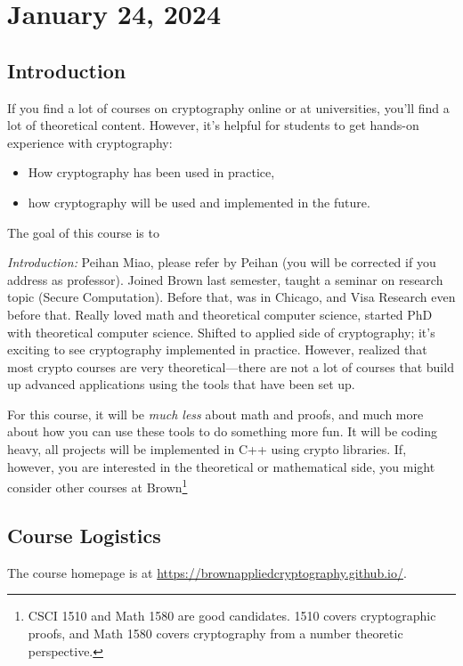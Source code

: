 \section{January 24, 2024}
\label{20230124}

\subsection{Introduction}
If you find a lot of courses on cryptography online or at universities, you'll find a lot of theoretical content. However, it's helpful for students to get hands-on experience with cryptography:
\begin{itemize}
    \item How cryptography has been used in practice,
    \item how cryptography will be used and implemented in the future.
\end{itemize}

The goal of this course is to

\emph{Introduction:} Peihan Miao, please refer by Peihan (you will be corrected if you address as professor). Joined Brown last semester, taught a seminar on research topic (Secure Computation). Before that, was in Chicago, and Visa Research even before that. Really loved math and theoretical computer science, started PhD with theoretical computer science. Shifted to applied side of cryptography; it's exciting to see cryptography implemented in practice. However, realized that most crypto courses are very theoretical---there are not a lot of courses that build up advanced applications using the tools that have been set up.

For this course, it will be \emph{much less} about math and proofs, and much more about how you can use these tools to do something more fun. It will be coding heavy, all projects will be implemented in C++ using crypto libraries. If, however, you are interested in the theoretical or mathematical side, you might consider other courses at Brown\footnote{CSCI 1510 and Math 1580 are good candidates. 1510 covers cryptographic proofs, and Math 1580 covers cryptography from a number theoretic perspective.}

\subsection{Course Logistics}
The course homepage is at \url{https://brownappliedcryptography.github.io/}.


